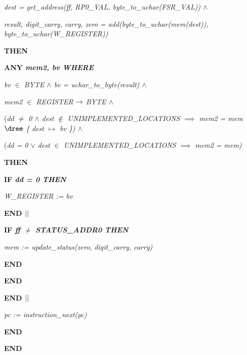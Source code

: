 \begin{sloppypar}
\hspace*{0.80in}\it dest \rm = \it get\_address\rm (\it ff\rm , \it RP0\_VAL\rm , \it byte\_to\_uchar\rm (\it FSR\_VAL\rm )\rm )  $\land$ 

\hspace*{0.80in}\it result\rm , \it digit\_carry\rm , \it carry\rm , \it zero \rm = \it add\rm (\it byte\_to\_uchar\rm (\it mem\rm (\it dest\rm )\rm )\rm , \it byte\_to\_uchar\rm (\it W\_REGISTER\rm )\rm )

\hspace*{0.60in}\bf THEN

\hspace*{0.80in}\bf ANY \it mem2\rm , \it bv \bf WHERE

\hspace*{1.00in}\it bv  $\in$  \it BYTE  $\land$  \it bv \rm = \it uchar\_to\_byte\rm (\it result\rm )  $\land$ 

\hspace*{1.00in}\it mem2  $\in$  \it REGISTER  $\rightarrow$  \it BYTE  $\land$ 

\hspace*{1.00in}\rm (\it dd  $\not =$  \rm 0  $\land$  \it dest  $\not\in$  \it UNIMPLEMENTED\_LOCATIONS  $\implies$  \it mem2 \rm = \it mem  $\lover$  \rm \{ \it dest  $\mapsto$  \it bv \rm \}\rm )  $\land$ 

\hspace*{1.00in}\rm (\it dd \rm = \rm 0  $\lor$  \it dest  $\in$  \it UNIMPLEMENTED\_LOCATIONS  $\implies$  \it mem2 \rm = \it mem\rm )

\hspace*{0.80in}\bf THEN

\hspace*{1.00in}\bf IF \it dd \rm = \rm 0 \bf THEN

\hspace*{1.20in}\it W\_REGISTER \rm := \it bv

\hspace*{1.00in}\bf END  $\mbox{$\mid\mid$}$ 

\hspace*{1.00in}\bf IF \it ff  $\not =$  \it STATUS\_ADDR0 \bf THEN

\hspace*{1.20in}\it mem \rm := \it update\_status\rm (\it zero\rm , \it digit\_carry\rm , \it carry\rm )

\hspace*{1.00in}\bf END

\hspace*{0.80in}\bf END

\hspace*{0.60in}\bf END  $\mbox{$\mid\mid$}$ 

\hspace*{0.60in}\it pc \rm := \it instruction\_next\rm (\it pc\rm )

\hspace*{0.40in}\bf END

 

\bf END

\newpage
\end{sloppypar}
